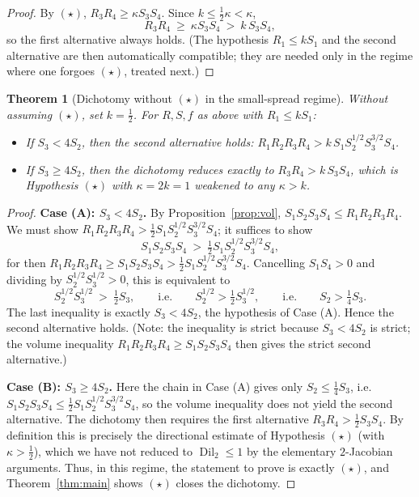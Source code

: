 \documentclass[11pt]{article}
\newtheorem{theorem}{Theorem}
\theoremstyle{remark}
\newcommand{\Dil}{\operatorname{Dil}}
\begin{document}
\begin{proof}
By $(\star)$, $R_3R_4\ge\kappa S_3S_4$. Since $k\le\tfrac12\kappa<\kappa$,
\[
R_3R_4\ \ge\ \kappa S_3S_4\ >\ k\,S_3S_4 ,
\]
so the first alternative always holds. (The hypothesis $R_1\le kS_1$ and the second
alternative are then automatically compatible; they are needed only in the regime where one
forgoes $(\star)$, treated next.)
\end{proof}

\begin{theorem}[Dichotomy without $(\star)$ in the small-spread regime]\label{thm:caseA}
Without assuming $(\star)$, set $k=\tfrac12$. For $R,S,f$ as above with $R_1\le kS_1$:
\begin{itemize}
\item[\textbf{(A)}] If $S_3<4S_2$, then the second alternative holds:
$R_1R_2R_3R_4>k\,S_1S_2^{1/2}S_3^{3/2}S_4$.
\item[\textbf{(B)}] If $S_3\ge4S_2$, then the dichotomy reduces exactly to
$R_3R_4>k\,S_3S_4$, which is Hypothesis $(\star)$ with $\kappa=2k=1$ weakened to any
$\kappa>k$.
\end{itemize}
\end{theorem}

\begin{proof}
\textbf{Case (A): $S_3<4S_2$.} By Proposition~\ref{prop:vol},
$S_1S_2S_3S_4\le R_1R_2R_3R_4$. We must show
$R_1R_2R_3R_4>\tfrac12 S_1S_2^{1/2}S_3^{3/2}S_4$; it suffices to show
\[
S_1S_2S_3S_4\ >\ \tfrac12 S_1S_2^{1/2}S_3^{3/2}S_4 ,
\]
for then $R_1R_2R_3R_4\ge S_1S_2S_3S_4>\tfrac12 S_1S_2^{1/2}S_3^{3/2}S_4$. Cancelling
$S_1S_4>0$ and dividing by $S_2^{1/2}S_3^{1/2}>0$, this is equivalent to
\[
S_2^{1/2}S_3^{1/2}\ >\ \tfrac12 S_3 ,\qquad\text{i.e.}\qquad S_2^{1/2}>\tfrac12 S_3^{1/2},
\qquad\text{i.e.}\qquad S_2>\tfrac14 S_3 .
\]
The last inequality is exactly $S_3<4S_2$, the hypothesis of Case (A). Hence the second
alternative holds. (Note: the inequality is strict because $S_3<4S_2$ is strict; the volume
inequality $R_1R_2R_3R_4\ge S_1S_2S_3S_4$ then gives the strict second alternative.)

\medskip
\textbf{Case (B): $S_3\ge4S_2$.} Here the chain in Case (A) gives only
$S_2\le\tfrac14 S_3$, i.e.\ $S_1S_2S_3S_4\le\tfrac12 S_1S_2^{1/2}S_3^{3/2}S_4$, so the
volume inequality does not yield the second alternative. The dichotomy then requires the
first alternative $R_3R_4>\tfrac12 S_3S_4$. By definition this is precisely the directional
estimate of Hypothesis $(\star)$ (with $\kappa>\tfrac12$), which we have not reduced to
$\Dil_2\le1$ by the elementary $2$-Jacobian arguments. Thus, in this regime, the
statement to prove is exactly $(\star)$, and Theorem~\ref{thm:main} shows $(\star)$ closes
the dichotomy.
\end{proof}
\end{document}
